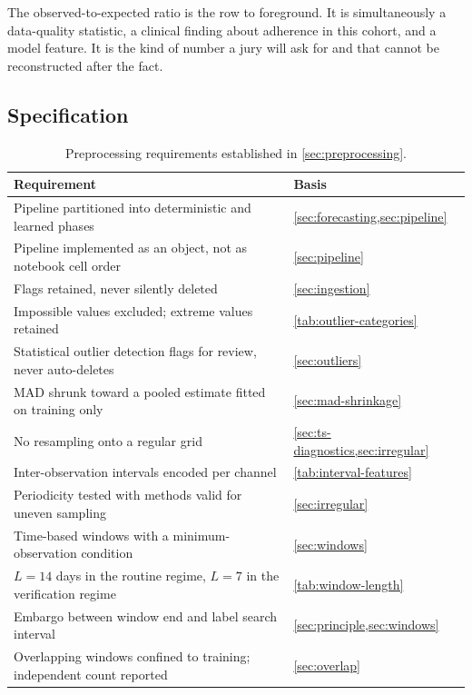 \documentclass[12pt,a4paper,oneside]{report}
\begin{document}
The observed-to-expected ratio is the row to foreground. It is simultaneously a data-quality statistic, a clinical finding about adherence in this cohort, and a model feature. It is the kind of number a jury will ask for and that cannot be reconstructed after the fact.

\subsection{Specification}\label{sec:spec32}

\begin{table}[htbp]
\centering\footnotesize
\caption{Preprocessing requirements established in \cref{sec:preprocessing}.}\label{tab:spec32}
\begin{tabularx}{\textwidth}{@{}X >{\raggedright\arraybackslash}p{5.2cm}@{}}
\toprule
\textbf{Requirement} & \textbf{Basis} \\
\midrule
Pipeline partitioned into deterministic and learned phases & \cref{sec:forecasting,sec:pipeline} \\
Pipeline implemented as an object, not as notebook cell order & \cref{sec:pipeline} \\
Flags retained, never silently deleted & \cref{sec:ingestion} \\
Impossible values excluded; extreme values retained & \cref{tab:outlier-categories} \\
Statistical outlier detection flags for review, never auto-deletes & \cref{sec:outliers} \\
MAD shrunk toward a pooled estimate fitted on training only & \cref{sec:mad-shrinkage} \\
No resampling onto a regular grid & \cref{sec:ts-diagnostics,sec:irregular} \\
Inter-observation intervals encoded per channel & \cref{tab:interval-features} \\
Periodicity tested with methods valid for uneven sampling & \cref{sec:irregular} \\
Time-based windows with a minimum-observation condition & \cref{sec:windows} \\
$L = 14$ days in the routine regime, $L = 7$ in the verification regime & \cref{tab:window-length} \\
Embargo between window end and label search interval & \cref{sec:principle,sec:windows} \\
Overlapping windows confined to training; independent count reported & \cref{sec:overlap} \\

\end{tabularx}
\end{table}
\end{document}
